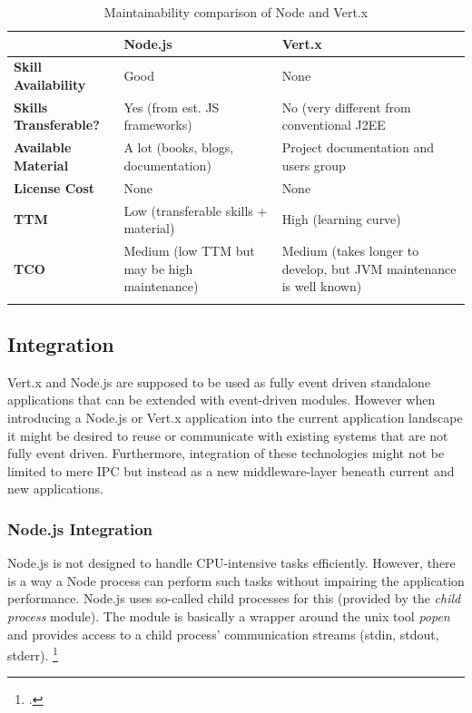 \begin{savenotes}
\begin{longtable}[c]{p{} p{} p{}}
\toprule
				& \textbf{Node.js} & \textbf{Vert.x} \\
\midrule 
\endhead
\textbf{Skill Availability}		& Good			& None%
\\							  
\textbf{Skills Transferable?}	& Yes (from est. JS frameworks)	& No (very different from conventional J2EE\nomenclature{J2EE}{Java 2 Enterprise  Edition}
\\
\textbf{Available Material}		& A lot (books, blogs, documentation) & Project documentation and users group
\\
\textbf{License Cost}			& None 			& None
 \\
 \textbf{TTM} 					& Low (transferable skills + material) & High (learning curve)
 \\
 \textbf{TCO}					& Medium (low TTM but may be high maintenance) & Medium (takes longer to develop, but JVM maintenance is well known)
 \\
\bottomrule 
  \caption{Maintainability comparison of Node and Vert.x}
  \label{tbl_maintain}
\end{longtable}
\end{savenotes}

\subsection{Integration}
\label{integration}
Vert.x and Node.js are supposed to be used as fully event driven standalone
applications that can be extended with event-driven modules.
However when introducing a Node.js or Vert.x application into the current
application landscape it might be desired to reuse or communicate with existing
systems that are not fully event driven. Furthermore, integration of these
technologies might not be limited to mere IPC but instead as a new middleware-layer beneath current and new
applications.\\

\subsubsection{Node.js Integration}
\label{node_integration}
Node.js is not designed to handle CPU-intensive tasks efficiently. However,
there is a way a Node process can perform such tasks without impairing the
application performance. Node.js uses so-called child processes for this
(provided by the \textit{child process}
module). The module is basically a wrapper around the unix tool \textit{popen} and
provides access to a child process' communication streams (stdin, stdout, stderr).
\footcite[Cf.][]{node_child_process}

